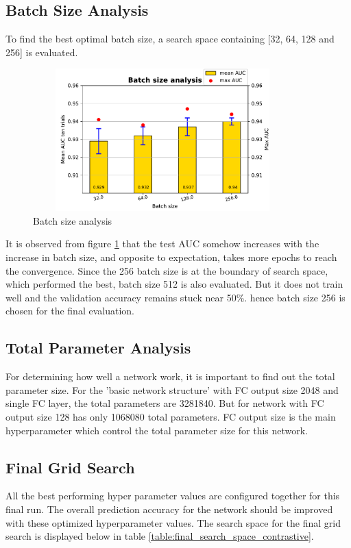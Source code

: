 \subsection{Batch Size Analysis}
To find the best optimal batch size, a search space containing [32, 64, 128 and 256] is evaluated.

\begin{figure}[ht]
\centering
\includegraphics[width=10cm,height= 5.5cm]{images/contrastive/contrastive_loss_batchsize_bar}
\caption{Batch size analysis}
\label{fig:contrastive_loss_batchsize_bar}
\end{figure}

It is observed from figure \ref{fig:contrastive_loss_batchsize_bar} that the test AUC somehow increases with the increase in batch size, and opposite to expectation, takes more epochs to reach the convergence. 
Since the 256 batch size is at the boundary of search space, which performed the best, batch size 512 is also evaluated. But it does not train well and the validation accuracy remains stuck near 50\%.
hence batch size 256 is chosen for the final evaluation. 

\subsection{Total Parameter Analysis}
For determining how well a network work, it is important to find out the total parameter size. For the 'basic network structure' with FC output size 2048 and single FC layer, the total parameters are 3281840. 
But for network with FC output size 128 has only 1068080 total parameters. FC output size is the main hyperparameter which control the total parameter size for this network.

\subsection{Final Grid Search}
All the best performing hyper parameter values are configured together for this final run. The overall prediction accuracy for the network should be improved with these optimized hyperparameter values.
The search space for the final grid search is displayed below in table \ref{table:final_search_space_contrastive}.
 

